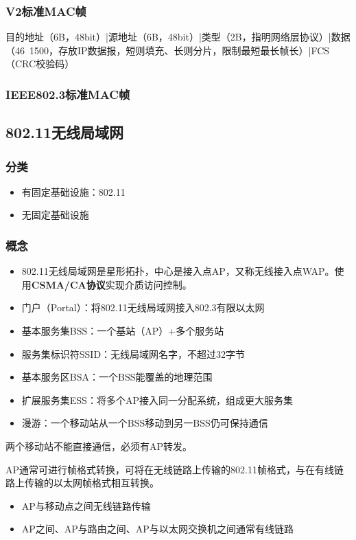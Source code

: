 \subsubsection{V2标准MAC帧}
目的地址（6B，48bit）|源地址（6B，48bit）|类型（2B，指明网络层协议）|数据（46~1500，存放IP数据报，短则填充、长则分片，限制最短最长帧长）|FCS（CRC校验码）


\subsubsection{IEEE802.3标准MAC帧}


\subsection{802.11无线局域网}

\subsubsection{分类}
\begin{itemize}
    \item 有固定基础设施：802.11
    \item 无固定基础设施
\end{itemize}


\subsubsection{概念}

\begin{itemize}
    \item 802.11无线局域网是星形拓扑，中心是接入点AP，又称无线接入点WAP。使用\textbf{CSMA/CA协议}实现介质访问控制。
    \item 门户（Portal）：将802.11无线局域网接入802.3有限以太网
    \item 基本服务集BSS：一个基站（AP）+多个服务站
    \item 服务集标识符SSID：无线局域网名字，不超过32字节
    \item 基本服务区BSA：一个BSS能覆盖的地理范围
    \item 扩展服务集ESS：将多个AP接入同一分配系统，组成更大服务集
    \item 漫游：一个移动站从一个BSS移动到另一BSS仍可保持通信
\end{itemize}
两个移动站不能直接通信，必须有AP转发。

AP通常可进行帧格式转换，可将在无线链路上传输的802.11帧格式，与在有线链路上传输的以太网帧格式相互转换。
\begin{itemize}
    \item AP与移动点之间无线链路传输
    \item AP之间、AP与路由之间、AP与以太网交换机之间通常有线链路
\end{itemize}


